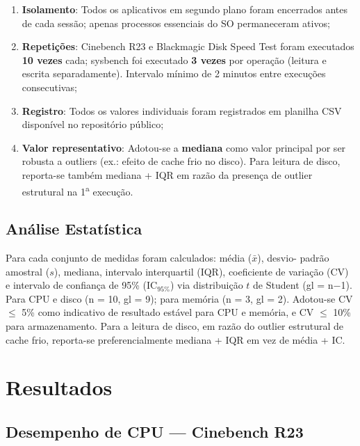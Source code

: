 \documentclass[12pt]{article}
\begin{document}
\begin{enumerate}
  \item \textbf{Isolamento}: Todos os aplicativos em segundo plano foram
  encerrados antes de cada sess\~ao; apenas processos essenciais do SO
  permaneceram ativos;
  \item \textbf{Repeti\c{c}\~oes}: Cinebench R23 e Blackmagic Disk Speed Test
  foram executados \textbf{10 vezes} cada; sysbench foi executado
  \textbf{3 vezes} por opera\c{c}\~ao (leitura e escrita separadamente).
  Intervalo m\'inimo de 2 minutos entre execu\c{c}\~oes consecutivas;
  \item \textbf{Registro}: Todos os valores individuais foram registrados
  em planilha CSV dispon\'ivel no reposit\'orio p\'ublico;
  \item \textbf{Valor representativo}: Adotou-se a \textbf{mediana} como
  valor principal por ser robusta a outliers (ex.: efeito de cache frio
  no disco). Para leitura de disco, reporta-se tamb\'em mediana + IQR
  em raz\~ao da presen\c{c}a de outlier estrutural na 1\textsuperscript{a}
  execu\c{c}\~ao.
\end{enumerate}

\subsection{An\'alise Estat\'istica}

Para cada conjunto de medidas foram calculados: m\'edia ($\bar{x}$), desvio-
padr\~ao amostral ($s$), mediana, intervalo interquartil (IQR), coeficiente de
varia\c{c}\~ao (CV) e intervalo de confian\c{c}a de 95\% (IC$_{95\%}$) via
distribui\c{c}\~ao $t$ de Student (gl = n$-$1). Para CPU e disco (n = 10,
gl = 9); para mem\'oria (n = 3, gl = 2). Adotou-se CV $\leq$ 5\% como
indicativo de resultado est\'avel para CPU e mem\'oria, e CV $\leq$ 10\%
para armazenamento. Para a leitura de disco, em raz\~ao do outlier estrutural
de cache frio, reporta-se preferencialmente mediana + IQR em vez de m\'edia
+ IC.


\section{Resultados}

\subsection{Desempenho de CPU --- Cinebench R23}
\end{document}
